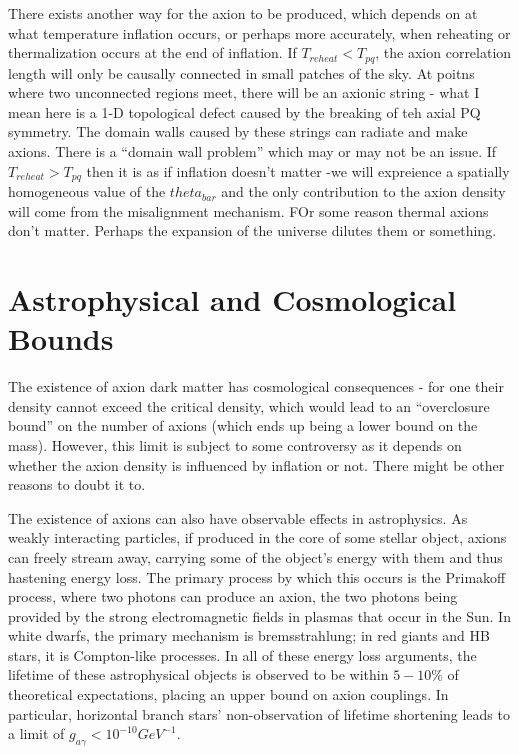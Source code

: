 \documentclass[12pt, twoside]{book}
\begin{document}
There exists another way for the axion to be produced, which depends on at what temperature inflation occurs, or perhaps more accurately, when reheating or thermalization occurs at the end of inflation. If $T_{reheat} < T_{pq}$, the axion correlation length will only be causally connected in small patches of the sky. At poitns where two unconnected regions meet, there will be an axionic string - what I mean here is a 1-D topological defect caused by the breaking of teh axial PQ symmetry. The domain walls caused by these strings can radiate and make axions. There is a “domain wall problem” which may or may not be an issue. If $T_{reheat} > T_{pq}$ then it is as if inflation doesn’t matter -we will expreience a spatially homogeneous value of the $theta_{bar}$ and the only contribution to the axion density will come from the misalignment mechanism. FOr some reason thermal axions don’t matter. Perhaps the expansion of the universe dilutes them or something.

\section{Astrophysical and Cosmological Bounds}
The existence of axion dark matter has cosmological consequences - for one their density cannot exceed the critical density, which would lead to an “overclosure bound” on the number of axions (which ends up being a lower bound on the mass). However, this limit is subject to some controversy as it depends on whether the axion density is influenced by inflation or not. There might be other reasons to doubt it to. 

The existence of axions can also have observable effects in astrophysics. As weakly interacting particles, if produced in the core of some stellar object, axions can freely stream away, carrying some of the object’s energy with them and thus hastening energy loss. The primary process by which this occurs is the Primakoff process, where two photons can produce an axion, the two photons being provided by the strong electromagnetic fields in plasmas that occur in the Sun. In white dwarfs, the primary mechanism is bremsstrahlung; in red giants and HB stars, it is Compton-like processes. In all of these energy loss arguments, the lifetime of these astrophysical objects is observed to be within $5-10\%$ of theoretical expectations, placing an upper bound on axion couplings. In particular, horizontal branch stars’ non-observation of lifetime shortening leads to a limit of $g_{a\gamma} < 10^{-10} GeV^{-1}$. 
\end{document}
